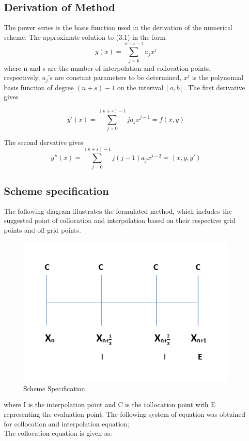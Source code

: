 \documentclass[12pt]{article}
\begin{document}
\subsection{Derivation of Method}
\noindent The power series is the basis function used in the derivation of the numerical scheme. The approximate solution to (3.1) in the form
	\begin{equation}
	y(x) = \sum_{j=0}^{n+s-1}a_{j}x^{j}								
	\end{equation}
	where n and s are the number of interpolation and collocation points, respectively, $a_j$'s are constant parameters to be determined, $x^j$ is the polynomial basis function of degree $(n+s)-1$ on the intertval $[a,b]$. The first derivative gives
	
	\begin{equation}
	y'(x)=\sum_{j=0}^{(n+s)-1} j a_{j}x^{j-1}=f(x,y)
	\end{equation}
	
	The second dervative gives
	\begin{equation}
	y''(x)=\sum_{j=0}^{(n+s)-1} j(j-1) a_{j}x^{j-2}=(x,y,y')
	\end{equation}
	
\subsection{Scheme specification}
\noindent The following diagram illustrates the formulated method, which includes the suggested point of collocation and interpolation based on their respective grid points and off-grid points.

\begin{figure}[H]
	\centering
	\includegraphics[width=0.7\linewidth]{"main scheme"}
	\caption{Scheme Specification}
	\label{fig:main-scheme}
\end{figure}

\noindent where I is the interpolation point and C is the collocation point with E representing the evaluation point.
The following system of equation was obtained for collocation and  interpolation equation;\\
\noindent The collocation equation is given as:
\end{document}
